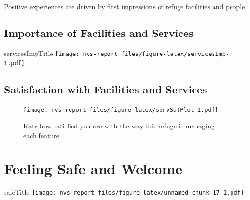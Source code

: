 \documentclass[]{book}
\begin{document}
Positive experiences are driven by first impressions of refuge
facilities and people.

\subsection*{Importance of Facilities and
Services}\label{importance-of-facilities-and-services}

servicesImpTitle
\texttt{[image: nvs-report\_files/figure-latex/servicesImp-1.pdf]}

\subsection*{Satisfaction with Facilities and
Services}\label{satisfaction-with-facilities-and-services}

\begin{figure}
\centering
\texttt{[image: nvs-report\_files/figure-latex/servSatPlot-1.pdf]}
\caption{\label{fig:servSatPlot}Rate how satisfied you are with the way this
refuge is managing each feature}
\end{figure}

\section*{Feeling Safe and Welcome}\label{feeling-safe-and-welcome-1}

safeTitle
\texttt{[image: nvs-report\_files/figure-latex/unnamed-chunk-17-1.pdf]}


\end{document}
